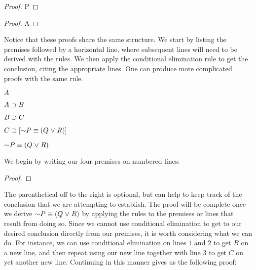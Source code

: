 \begin{multicols}{2}

\begin{proof}
	 \pr{}
	P \pr{}
	 
\end{proof}


\begin{proof}
	 \pr{}
	 \pr{}
	A 
\end{proof}

\end{multicols}

Notice that these proofs share the same structure.
We start by listing the premises followed by a horizontal line, where subsequent lines will need to be derived with the rules.
We then apply the conditional elimination rule to get the conclusion, citing the appropriate lines.
One can produce more complicated proofs with the same rule.

\begin{earg}

\item[] $A$ 
\item[] $A \supset B$ 
\item[] $B \supset C$ 
\item[] $C \eif [\enot P \eiff (Q \eor R)]$ 
\item[\therefore] $\enot P \eiff (Q \eor R)$
\end{earg}

We begin by writing our four premises on numbered lines:

\begin{proof}
	 \pr{}
	 \pr{}
	 \pr{}
	 
\end{proof}

The parenthetical off to the right is optional, but can help to keep track of the conclusion that we are attempting to establish.
The proof will be complete once we derive $\enot P \eiff (Q \eor R)$ by applying the rules to the premises or lines that result from doing so.
Since we cannot use conditional elimination to get to our desired conclusion directly from our premises, it is worth considering what we can do.
For instance, we can use conditional elimination on lines $1$ and $2$ to get $B$ on a new line, and then repeat using our new line together with line $3$ to get $C$ on yet another new line. 
Continuing in this manner gives us the following proof:

